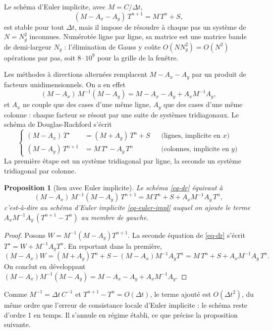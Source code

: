 \documentclass[11pt,a4paper]{article}
\newtheorem{proposition}{Proposition}
\theoremstyle{definition}
\theoremstyle{remark}
\newcommand{\dt}{\Delta t}
\begin{document}
Le schéma d'Euler implicite, avec $M = C/\dt$,
\begin{equation}\label{eq-euler-impl}
(M - A_x - A_y)\,T^{n+1} = M\,T^n + S,
\end{equation}
est stable pour tout $\dt$, mais il impose de résoudre à chaque pas un système de
$N = N_g^2$ inconnues. Numérotée ligne par ligne, sa matrice est une matrice bande
de demi-largeur $N_g$ : l'élimination de Gauss y coûte $O(N N_g^2) = O(N^2)$
opérations par pas, soit $8\cdot10^{9}$ pour la grille de la fenêtre.

Les méthodes à directions alternées \cite{peaceman1955,douglas1956} remplacent
$M - A_x - A_y$ par un produit de facteurs unidimensionnels. On a en effet
\[
(M - A_x)\,M^{-1}(M - A_y) = M - A_x - A_y + A_x M^{-1} A_y,
\]
et $A_x$ ne couple que des cases d'une même ligne, $A_y$ que des cases d'une même
colonne : chaque facteur se résout par une suite de systèmes tridiagonaux. Le schéma
de Douglas-Rachford s'écrit
\begin{equation}\label{eq-dr}
\left\{
\begin{aligned}
(M - A_x)\,T^{\star}  &= (M + A_y)\,T^{n} + S &&\text{(lignes, implicite en $x$)}\\
(M - A_y)\,T^{n+1}    &= M\,T^{\star} - A_y\,T^{n} &&\text{(colonnes, implicite en $y$)}
\end{aligned}
\right.
\end{equation}
La première étape est un système tridiagonal par ligne, la seconde un système
tridiagonal par colonne.

\begin{proposition}[lien avec Euler implicite]
Le schéma \eqref{eq-dr} équivaut à
\[
(M - A_x)\,M^{-1}(M - A_y)\,T^{n+1} = M\,T^n + S + A_x M^{-1} A_y\,T^n,
\]
c'est-à-dire au schéma d'Euler implicite \eqref{eq-euler-impl} auquel on ajoute le
terme $A_x M^{-1}A_y\,(T^{n+1} - T^n)$ au membre de gauche.
\end{proposition}

\begin{proof}
Posons $W = M^{-1}(M - A_y)T^{n+1}$. La seconde équation de \eqref{eq-dr} s'écrit
$T^\star = W + M^{-1}A_yT^n$. En reportant dans la première,
\[
(M - A_x)W = (M + A_y)T^n + S - (M - A_x)M^{-1}A_yT^n
           = M\,T^n + S + A_xM^{-1}A_y\,T^n.
\]
On conclut en développant $(M-A_x)M^{-1}(M-A_y) = M - A_x - A_y + A_xM^{-1}A_y$.
\end{proof}

Comme $M^{-1} = \dt\,C^{-1}$ et $T^{n+1} - T^n = O(\dt)$, le terme ajouté est
$O(\dt^2)$, du même ordre que l'erreur de consistance locale d'Euler implicite : le
schéma reste d'ordre 1 en temps. Il s'annule en régime établi, ce que précise la
proposition suivante.
\end{document}
